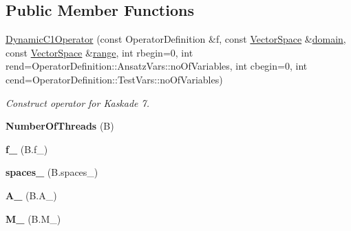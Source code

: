 \subsection*{\-Public \-Member \-Functions}
\begin{DoxyCompactItemize}
\item 
\hyperlink{classSpacy_1_1Kaskade_1_1DynamicC1Operator_a5b9e778e72f9e8039efcfca2a5776528}{\-Dynamic\-C1\-Operator} (const \-Operator\-Definition \&f, const \hyperlink{classSpacy_1_1VectorSpace}{\-Vector\-Space} \&\hyperlink{classSpacy_1_1OperatorBase_a2588f9b3e0188820c4c494e63293dc6f}{domain}, const \hyperlink{classSpacy_1_1VectorSpace}{\-Vector\-Space} \&\hyperlink{classSpacy_1_1OperatorBase_ab19d3b7a6f290b1079248f1e567e53d6}{range}, int rbegin=0, int rend=\-Operator\-Definition\-::\-Ansatz\-Vars\-::no\-Of\-Variables, int cbegin=0, int cend=\-Operator\-Definition\-::\-Test\-Vars\-::no\-Of\-Variables)
\begin{DoxyCompactList}\small\item\em \-Construct operator for \-Kaskade 7. \end{DoxyCompactList}\item 
\hypertarget{classSpacy_1_1Kaskade_1_1DynamicC1Operator_af1fbb17ae8d1ebb52e814751a3444955}{{\bfseries \-Number\-Of\-Threads} (\-B)}\label{classSpacy_1_1Kaskade_1_1DynamicC1Operator_af1fbb17ae8d1ebb52e814751a3444955}

\item 
\hypertarget{classSpacy_1_1Kaskade_1_1DynamicC1Operator_aaba78d9bc3ee0a8c3f95be2240820b6a}{{\bfseries f\-\_\-} (\-B.\-f\-\_\-)}\label{classSpacy_1_1Kaskade_1_1DynamicC1Operator_aaba78d9bc3ee0a8c3f95be2240820b6a}

\item 
\hypertarget{classSpacy_1_1Kaskade_1_1DynamicC1Operator_a8de0474d7244dd3abd6246fa8fcd6716}{{\bfseries spaces\-\_\-} (\-B.\-spaces\-\_\-)}\label{classSpacy_1_1Kaskade_1_1DynamicC1Operator_a8de0474d7244dd3abd6246fa8fcd6716}

\item 
\hypertarget{classSpacy_1_1Kaskade_1_1DynamicC1Operator_a102175834667d3f2b169414100c2178c}{{\bfseries \-A\-\_\-} (\-B.\-A\-\_\-)}\label{classSpacy_1_1Kaskade_1_1DynamicC1Operator_a102175834667d3f2b169414100c2178c}

\item 
\hypertarget{classSpacy_1_1Kaskade_1_1DynamicC1Operator_ade129f2f65c82856f583931e271f3edd}{{\bfseries \-M\-\_\-} (\-B.\-M\-\_\-)}\label{classSpacy_1_1Kaskade_1_1DynamicC1Operator_ade129f2f65c82856f583931e271f3edd}


\end{DoxyCompactItemize}
